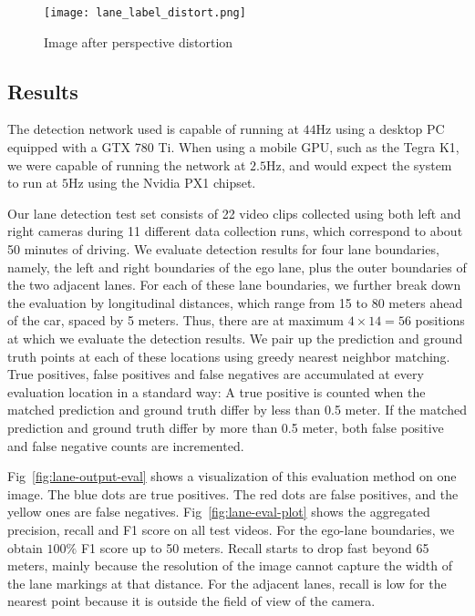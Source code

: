 \documentclass[journal]{IEEEtran}
\begin{document}
\begin{figure}[tb]
  \centering
    \texttt{[image: lane\_label\_distort.png]}
 \caption{Image after perspective distortion}
 \label{fig:lane-gt-distort}
\end{figure}



\subsection{Results}
The detection network used is capable of running at $44$Hz using a desktop PC equipped with a GTX 780 Ti. When using a mobile GPU, such as the Tegra K1, we were capable of running the network at $2.5$Hz, and would expect the system to run at $5$Hz using the Nvidia PX1 chipset. 

Our lane detection test set consists of 22 video clips collected using both left and right cameras during 11 different data collection runs, which correspond to about 50 minutes of driving. We evaluate detection results for four lane boundaries, namely, the left and right boundaries of the ego lane, plus the outer boundaries of the two adjacent lanes. For each of these lane boundaries, we further break down the evaluation by longitudinal distances, which range from 15 to 80 meters ahead of the car, spaced by 5 meters. Thus, there are at maximum $4\times14=56$ positions at which we evaluate the detection results. We pair up the prediction and ground truth points at each of these locations using greedy nearest neighbor matching. True positives, false positives and false negatives are accumulated at every evaluation location in a standard way: A true positive is counted when the matched prediction and ground truth differ by less than 0.5 meter. If the matched prediction and ground truth differ by more than 0.5 meter, both false positive and false negative counts are incremented.

Fig~\ref{fig:lane-output-eval} shows a visualization of this evaluation method on one image. The blue dots are true positives. The red dots are false positives, and the yellow ones are false negatives. Fig~\ref{fig:lane-eval-plot} shows the aggregated precision, recall and F1 score on all test videos. For the ego-lane boundaries, we obtain $100\%$ F1 score up to 50 meters. Recall starts to drop fast beyond 65 meters, mainly because the resolution of the image cannot capture the width of the lane markings at that distance. For the adjacent lanes, recall is low for the nearest point because it is outside the field of view of the camera.
\end{document}
